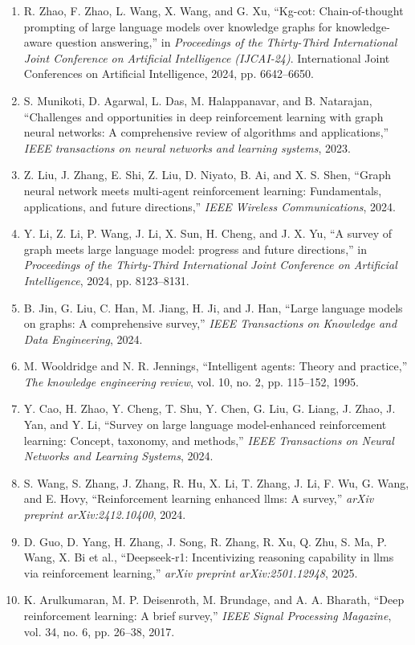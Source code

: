 \documentclass[10pt,UTF8,fontset=fandol]{ctexart}
\begin{document}
\begin{enumerate}[leftmargin=2.4em,labelsep=0.4em,itemsep=0.15em]
\item R. Zhao, F. Zhao, L. Wang, X. Wang, and G. Xu, ``Kg-cot: Chain-of-thought prompting of large language models over knowledge graphs for knowledge-aware question answering,'' in \textit{Proceedings of the Thirty-Third International Joint Conference on Artificial Intelligence (IJCAI-24)}. International Joint Conferences on Artificial Intelligence, 2024, pp. 6642--6650.
\item S. Munikoti, D. Agarwal, L. Das, M. Halappanavar, and B. Natarajan, ``Challenges and opportunities in deep reinforcement learning with graph neural networks: A comprehensive review of algorithms and applications,'' \textit{IEEE transactions on neural networks and learning systems}, 2023.
\item Z. Liu, J. Zhang, E. Shi, Z. Liu, D. Niyato, B. Ai, and X. S. Shen, ``Graph neural network meets multi-agent reinforcement learning: Fundamentals, applications, and future directions,'' \textit{IEEE Wireless Communications}, 2024.
\item Y. Li, Z. Li, P. Wang, J. Li, X. Sun, H. Cheng, and J. X. Yu, ``A survey of graph meets large language model: progress and future directions,'' in \textit{Proceedings of the Thirty-Third International Joint Conference on Artificial Intelligence}, 2024, pp. 8123--8131.
\item B. Jin, G. Liu, C. Han, M. Jiang, H. Ji, and J. Han, ``Large language models on graphs: A comprehensive survey,'' \textit{IEEE Transactions on Knowledge and Data Engineering}, 2024.
\item M. Wooldridge and N. R. Jennings, ``Intelligent agents: Theory and practice,'' \textit{The knowledge engineering review}, vol. 10, no. 2, pp. 115--152, 1995.
\item Y. Cao, H. Zhao, Y. Cheng, T. Shu, Y. Chen, G. Liu, G. Liang, J. Zhao, J. Yan, and Y. Li, ``Survey on large language model-enhanced reinforcement learning: Concept, taxonomy, and methods,'' \textit{IEEE Transactions on Neural Networks and Learning Systems}, 2024.
\item S. Wang, S. Zhang, J. Zhang, R. Hu, X. Li, T. Zhang, J. Li, F. Wu, G. Wang, and E. Hovy, ``Reinforcement learning enhanced llms: A survey,'' \textit{arXiv preprint arXiv:2412.10400}, 2024.
\item D. Guo, D. Yang, H. Zhang, J. Song, R. Zhang, R. Xu, Q. Zhu, S. Ma, P. Wang, X. Bi et al., ``Deepseek-r1: Incentivizing reasoning capability in llms via reinforcement learning,'' \textit{arXiv preprint arXiv:2501.12948}, 2025.
\item K. Arulkumaran, M. P. Deisenroth, M. Brundage, and A. A. Bharath, ``Deep reinforcement learning: A brief survey,'' \textit{IEEE Signal Processing Magazine}, vol. 34, no. 6, pp. 26--38, 2017.

\end{enumerate}
\end{document}

